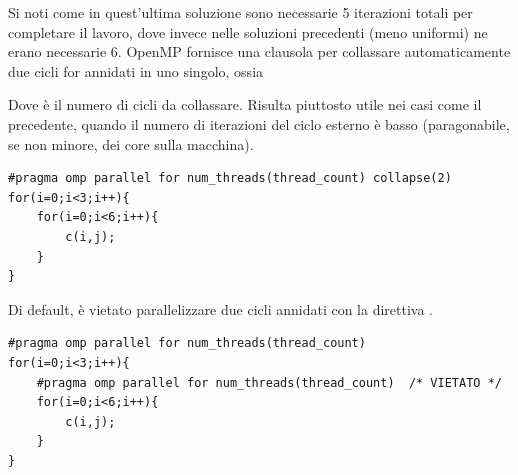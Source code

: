 \documentclass[10pt, letterpaper]{report}
\begin{document}
Si noti come in quest'ultima soluzione sono necessarie 5 iterazioni totali per completare il lavoro, dove invece nelle soluzioni precedenti (meno uniformi) ne erano necessarie 6.
OpenMP fornisce una clausola per collassare automaticamente due cicli for annidati in uno singolo, ossia  
\begin{quote}
\end{quote}
Dove  è il numero di cicli da collassare. Risulta piuttosto utile nei casi come il precedente, quando il numero di iterazioni del ciclo esterno è basso (paragonabile, se non minore, dei core sulla macchina).
\begin{lstlisting}[style=CStyle]
#pragma omp parallel for num_threads(thread_count) collapse(2)
for(i=0;i<3;i++){
    for(i=0;i<6;i++){
        c(i,j);
    }
}
\end{lstlisting}
Di default, è vietato parallelizzare due cicli annidati con la direttiva .
\begin{lstlisting}[style=CStyle]
#pragma omp parallel for num_threads(thread_count) 
for(i=0;i<3;i++){
    #pragma omp parallel for num_threads(thread_count)  /* VIETATO */
    for(i=0;i<6;i++){
        c(i,j);
    }
}
\end{lstlisting}
\end{document}

